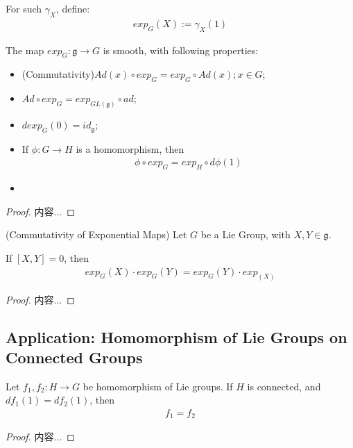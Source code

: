 \documentclass[Total.tex]{subfiles}
\begin{document}
			\begin{Def}
				For such $\gamma_X$, define:
				\begin{gather*}
					exp_G(X):=\gamma_X(1)
				\end{gather*}
			\end{Def}
			
			\begin{theorem}
				The map $exp_G:\mathfrak{g}\rightarrow G$ is smooth, with following properties:
				\begin{itemize}
					\item (Commutativity)$Ad(x)\circ exp_G=exp_G\circ Ad(x);x\in G$;
					\item $Ad\circ exp_G=exp_{GL(\mathfrak{g})}\circ ad$;
					\item $dexp_G(0)=id_\mathfrak{g}$;
					\item If $\phi:G\rightarrow H$ is a homomorphism, then
					\begin{gather*}
						\phi\circ exp_G=exp_H\circ d\phi(1)
					\end{gather*}
					\item 
				\end{itemize} 
			\end{theorem}
			\begin{proof}
				内容...
			\end{proof}
			
			\begin{proposition}
				(Commutativity of Exponential Maps) Let $G$ be a Lie Group, with $X,Y\in \mathfrak{g}$.
				
				If $[X,Y]=0$, then
				\begin{gather*}
					exp_G(X)\cdot exp_G(Y)=exp_G(Y)\cdot exp_(X)
				\end{gather*}
			\end{proposition}
			\begin{proof}
				内容...
			\end{proof}
			
			\subsection{Application: Homomorphism of Lie Groups on Connected Groups}
			\begin{lemma}
				Let $f_1,f_2:H\rightarrow G$ be homomorphism of Lie groups. If $H$ is connected, and $df_1(1)=df_2(1)$, then
				\begin{gather*}
					f_1=f_2
				\end{gather*}
			\end{lemma}
			\begin{proof}
				内容...
			\end{proof}
\end{document}
